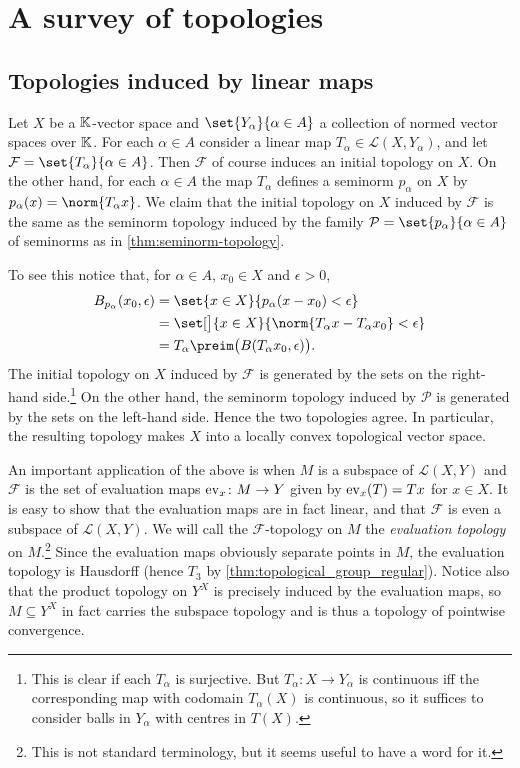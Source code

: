 \documentclass[article, a4paper, 11pt, oneside]{memoir}
\numberwithin{equation}{chapter}
\newcommand{\calP}{\mathcal{P}}
\newcommand{\calL}{\mathcal{L}}
\newcommand{\calF}{\mathcal{F}}
\begin{document}
\chapter{A survey of topologies}

\section{Topologies induced by linear maps}

Let $X$ be a $\mathbb{K}$-vector space and $\set{Y_\alpha}{\alpha \in A}$ a collection of normed vector spaces over $\mathbb{K}$. For each $\alpha \in A$ consider a linear map $T_\alpha \in \calL(X,Y_\alpha)$, and let $\calF = \set{T_\alpha}{\alpha \in A}$. Then $\calF$ of course induces an initial topology on $X$. On the other hand, for each $\alpha \in A$ the map $T_\alpha$ defines a seminorm $p_\alpha$ on $X$ by $p_\alpha(x) = \norm{T_\alpha x}$. We claim that the initial topology on $X$ induced by $\calF$ is the same as the seminorm topology induced by the family $\calP = \set{p_\alpha}{\alpha \in A}$ of seminorms as in \cref{thm:seminorm-topology}.

To see this notice that, for $\alpha \in A$, $x_0 \in X$ and $\epsilon > 0$,
%
\begin{align*}
    \ball[p_\alpha]{x_0}{\epsilon}
        &= \set{ x \in X }{ p_\alpha(x-x_0) < \epsilon } \\
        &= \set[\big]{ x \in X }{ \norm{T_\alpha x-T_\alpha x_0} < \epsilon } \\
        &= T_\alpha\preim \bigl( \ball{T_\alpha x_0}{\epsilon} \bigr).
\end{align*}
%
The initial topology on $X$ induced by $\calF$ is generated by the sets on the right-hand side.\footnote{This is clear if each $T_\alpha$ is surjective. But $T_\alpha \colon X \to Y_\alpha$ is continuous iff the corresponding map with codomain $T_\alpha(X)$ is continuous, so it suffices to consider balls in $Y_\alpha$ with centres in $T(X)$.} On the other hand, the seminorm topology induced by $\calP$ is generated by the sets on the left-hand side. Hence the two topologies agree. In particular, the resulting topology makes $X$ into a locally convex topological vector space.

An important application of the above is when $M$ is a subspace of $\calL(X,Y)$ and $\calF$ is the set of evaluation maps $\mathrm{ev}_x \colon M \to Y$ given by $\mathrm{ev}_x(T) = Tx$ for $x \in X$. It is easy to show that the evaluation maps are in fact linear, and that $\calF$ is even a subspace of $\calL(X,Y)$. We will call the $\calF$-topology on $M$ the \emph{evaluation topology} on $M$.\footnote{This is not standard terminology, but it seems useful to have a word for it.} Since the evaluation maps obviously separate points in $M$, the evaluation topology is Hausdorff (hence $T_3$ by \cref{thm:topological_group_regular}). Notice also that the product topology on $Y^X$ is precisely induced by the evaluation maps, so $M \subseteq Y^X$ in fact carries the subspace topology and is thus a topology of pointwise convergence.
\end{document}
